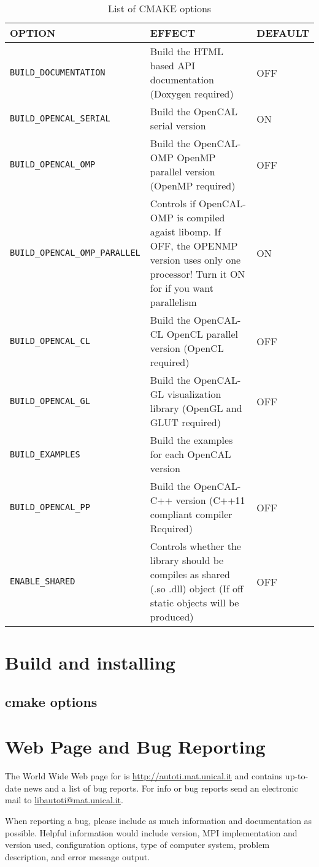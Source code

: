 \begin{table}[]
\centering
\caption{List of CMAKE options}
\label{ch:installation:cmakeoptions}
\begin{tabularx}{\textwidth}{|l|X|l|}
\hline
\textbf{OPTION} & \textbf{EFFECT} & \textbf{DEFAULT}\\ \hline
   \texttt{BUILD\_DOCUMENTATION}  &  Build the HTML based API documentation (Doxygen required)  & OFF   \\ \hline
  \texttt{BUILD\_OPENCAL\_SERIAL} & Build the OpenCAL serial version  & ON   \\ \hline
   \texttt{BUILD\_OPENCAL\_OMP} &  Build the OpenCAL-OMP OpenMP parallel version (OpenMP required)    & OFF \\ \hline
   \texttt{BUILD\_OPENCAL\_OMP\_PARALLEL} &  Controls if OpenCAL-OMP is compiled agaist libomp. If OFF, the OPENMP version uses only one processor! Turn it ON for if you want parallelism  &  ON  \\ \hline
   \texttt{BUILD\_OPENCAL\_CL} &  Build the OpenCAL-CL OpenCL parallel version (OpenCL required)     &OFF\\ \hline
   \texttt{BUILD\_OPENCAL\_GL} & Build the OpenCAL-GL visualization library (OpenGL and GLUT required)      &OFF \\ \hline                          
   \texttt{BUILD\_EXAMPLES} & Build the examples for each OpenCAL version      &\\ \hline
   \texttt{BUILD\_OPENCAL\_PP} &  Build the OpenCAL-C++ version (C++11 compliant compiler Required)    &  OFF\\ \hline
   \texttt{ENABLE\_SHARED} &  Controls whether the library should be compiles as shared  (.so .dll) object (If off static objects will be produced) & OFF\\ \hline                        
\end{tabularx}
\end{table}
\section{Build and installing}

\subsection{cmake options}




\section{Web Page and Bug Reporting}

The World Wide Web page for \texttt{\ocal} is
\url{http://autoti.mat.unical.it} and contains up-to-date news and
a list of bug reports. For info or bug reports send an electronic
mail to
\href{mailto:libautoti@mat.unical.it}{libautoti@mat.unical.it}.

When reporting a bug, please include as much information and
documentation as possible. Helpful information would include
\texttt{\ocal} version, MPI implementation and version used,
configuration options, type of computer system, problem
description, and error message output.

